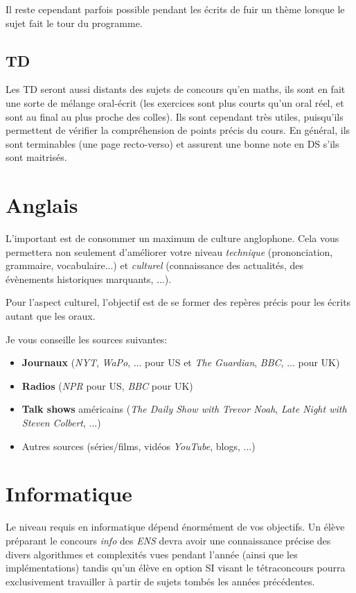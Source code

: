 \documentclass{article}
\begin{document}
Il reste cependant parfois possible pendant les écrits de fuir un thème lorsque le sujet fait le tour du programme.

\subsection{TD}
Les TD seront aussi distants des sujets de concours qu'en maths, ils sont en fait une sorte de mélange oral-écrit (les exercices sont plus courts qu'un oral réel, et sont au final au plus proche des colles).
Ils sont cependant très utiles, puisqu'ils permettent de vérifier la compréhension de points précis du cours.
En général, ils sont terminables (une page recto-verso) et assurent une bonne note en DS s'ils sont maitrisés.

\section{Anglais}
L'important est de consommer un maximum de culture anglophone.
Cela vous permettera non seulement d'améliorer votre niveau \textit{technique} (prononciation, grammaire, vocabulaire...) et \textit{culturel} (connaissance des actualités, des évènements historiques marquants, ...).

Pour l'aspect culturel, l'objectif est de se former des repères précis pour les écrits autant que les oraux.

Je vous conseille les sources suivantes:


\begin{itemize}
\item  \textbf{Journaux} (\textit{NYT}, \textit{WaPo}, ... pour US et \textit{The Guardian}, \textit{BBC}, ... pour UK)
\item  \textbf{Radios} (\textit{NPR} pour US, \textit{BBC} pour UK)
\item  \textbf{Talk shows} américains (\textit{The Daily Show with Trevor Noah}, \textit{Late Night with Steven Colbert}, ...)
\item  Autres sources (séries/films, vidéos \textit{YouTube}, blogs, ...)

\end{itemize}

\section{Informatique}
Le niveau requis en informatique dépend énormément de vos objectifs.
Un élève préparant le concours \textit{info} des \textit{ENS} devra avoir une connaissance précise des divers algorithmes et complexités vues pendant l'année (ainsi que les implémentations) tandis qu'un élève en option SI visant le tétraconcours pourra exclusivement travailler à partir de sujets tombés les années précédentes.
\end{document}
